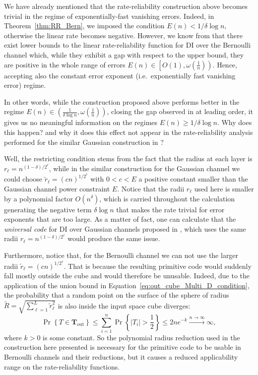 \documentclass[10pt, conference]{IEEEtran}
\newcommand{\1}{\mathds{1}}
\begin{document}
We have already mentioned that the rate-reliability construction above becomes trivial in the regime of exponentially-fast vanishing errors. Indeed, in Theorem~\ref{thm:RR_Bern}, we imposed the condition $E(n)<1/\delta \log n$, otherwise the linear rate becomes negative. However, we know from \cite{CDBW:Reliability-TCOM} that there exist lower bounds to the linear rate-reliability function for DI over the Bernoulli channel which, while they exhibit a gap with respect to the upper bound, they are positive in the whole range of errors $E(n)\in\left[O(1),\omega(\frac1n)\right)$. Hence, accepting also the constant error exponent (i.e.~exponentially fast vanishing error) regime. 

In other words, while the construction proposed above performs better in the regime $E(n)\in\left(\frac{1}{\delta\log n},\omega(\frac1n)\right)$, closing the gap observed in \cite{CDBW:Reliability-TCOM} at leading order, it gives us no meaningful information on the regimes $E(n)\geq1/\delta\log n$. Why does this happen? and why it does this effect not appear in the rate-reliability analysis performed for the similar Gaussian construction in \cite{CDBW:Gauss}?

Well, the restricting condition stems from the fact that the radius at each layer is $r_\ell=n^{(1-\delta)/2^\ell}$, while in the similar construction for the Gaussian channel we could choose $\tilde r_\ell=(cn)^{1/2^\ell}$ with $0<c<E$ a positive constant smaller than the Gaussian channel power constraint $E$. Notice that the radii $r_\ell$ used here is smaller by a polynomial factor $O(n^\delta)$, which is carried throughout the calculation generating the negative term $\delta\log n$ that makes the rate trivial for error exponents that are too large. As a matter of fact, one can calculate that the \emph{universal code} for DI over Gaussian channels proposed in \cite{CDBW:Gauss}, which uses the same radii $r_\ell=n^{(1-\delta)/2^\ell}$ would produce the same issue. 

Furthermore, notice that, for the Bernoulli channel we can not use the larger radii $\tilde r_\ell=(cn)^{1/2^\ell}$. That is because the resulting primitive code would suddenly fall mostly outside the cube and would therefore be unusable. Indeed, due to the application of the union bound in Equation~\eqref{eq:out_cube_Multi_D_condition}, the probability that a random point on the surface of the sphere of radius $\tilde R=\sqrt{\sum_{\ell=1}^L\tilde{r}_\ell^2}$ is also inside the input space cube diverges:
\begin{equation}
\!\!\Pr\left\{T\in \mathbf{T}_{\text{out}}\right\}\leq\sum_{i=1}^n\Pr\left\{|T_i|\!>\! \frac12\right\}\leq 2ne^{-k}\stackrel{n\to\infty}{\longrightarrow}\infty,
\end{equation}
where $k>0$ is some constant. So the polynomial radius reduction used in the construction here presented is necessary for the primitive code to be usable in Bernoulli channels and their reductions, but it causes a reduced applicability range on the rate-reliability functions.
\end{document}
